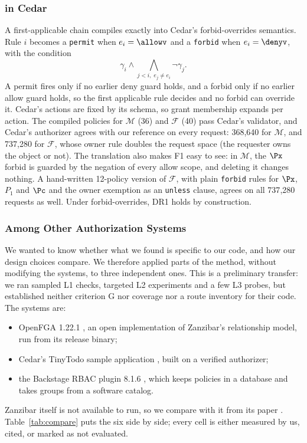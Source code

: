 \subsubsection{\chain in Cedar}

A first-applicable chain compiles exactly into Cedar's forbid-overrides semantics. Rule $i$ becomes a
\texttt{permit} when $e_i=\allowv$ and a \texttt{forbid} when $e_i=\denyv$, with the condition
\[
\gamma_i\wedge\textstyle\bigwedge_{j<i,\;e_j\neq e_i}\neg\gamma_j .
\]
A permit fires only if no earlier deny guard holds, and a forbid only if no earlier allow guard holds, so the
first applicable rule decides and no forbid can override it. Cedar's actions are fixed by its schema, so grant
membership expands per action. The compiled policies for $\mathcal{M}$ (36) and $\mathcal{F}$ (40) pass Cedar's
validator, and Cedar's authorizer agrees with our reference on every request: 368{,}640 for $\mathcal{M}$, and
737{,}280 for $\mathcal{F}$, whose owner rule doubles the request space (the requester owns the object or not).
The translation also makes F1 easy to see: in $\mathcal{M}$, the $\Px$ forbid is guarded by the negation of every
allow scope, and deleting it changes nothing. A hand-written 12-policy version of $\mathcal{F}$, with plain
\texttt{forbid} rules for $\Px$, $P_1$ and $\Pc$ and the owner exemption as an \texttt{unless} clause, agrees on
all 737{,}280 requests as well. Under forbid-overrides, DR1 holds by construction.

\subsubsection{\sysname Among Other Authorization Systems}
\label{sec:compare}

We wanted to know whether what we found is specific to our code, and how our design choices compare. We
therefore applied parts of the method, without modifying the systems, to three independent ones. This is a
preliminary transfer: we ran sampled L1 checks, targeted L2 experiments and a few L3 probes, but established
neither criterion G nor coverage nor a route inventory for their code. The systems are:
\begin{itemize}
\item OpenFGA 1.22.1 \cite{openfga}, an open implementation of Zanzibar's relationship model, run from its
release binary;
\item Cedar's TinyTodo sample application \cite{cedarexamples}, built on a verified authorizer;
\item the Backstage RBAC plugin 8.1.6 \cite{backstagerbac}, which keeps policies in a database and takes groups
from a software catalog.
\end{itemize} Zanzibar
itself is not available to run, so we compare with it from its paper \cite{pang2019zanzibar}.
Table~\ref{tab:compare} puts the six side by side; every cell is either measured by us, cited, or marked as not
evaluated.

